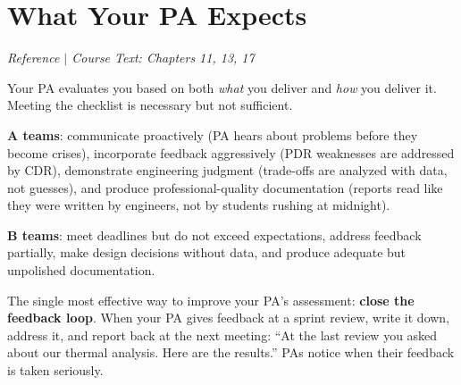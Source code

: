 \section{What Your PA Expects}
\textit{Reference $|$ Course Text: Chapters 11, 13, 17}

Your PA evaluates you based on both \emph{what} you deliver and \emph{how} you deliver it. Meeting the checklist is necessary but not sufficient.

\begin{faqbox}
\textbf{A teams}: communicate proactively (PA hears about problems before they become crises), incorporate feedback aggressively (PDR weaknesses are addressed by CDR), demonstrate engineering judgment (trade-offs are analyzed with data, not guesses), and produce professional-quality documentation (reports read like they were written by engineers, not by students rushing at midnight).

\textbf{B teams}: meet deadlines but do not exceed expectations, address feedback partially, make design decisions without data, and produce adequate but unpolished documentation.
\end{faqbox}

\begin{protip}
The single most effective way to improve your PA's assessment: \textbf{close the feedback loop}. When your PA gives feedback at a sprint review, write it down, address it, and report back at the next meeting: ``At the last review you asked about our thermal analysis. Here are the results.'' PAs notice when their feedback is taken seriously.
\end{protip}


